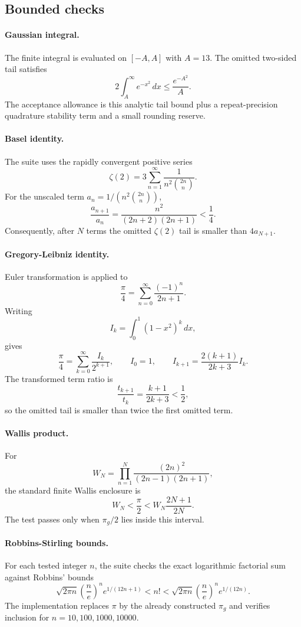 \documentclass[11pt]{article}
\newcommand{\pig}{\pi_g}
\begin{document}
\subsection{Bounded checks}

\paragraph{Gaussian integral.}
The finite integral is evaluated on $[-A,A]$ with $A=13$.  The omitted two-sided tail satisfies
\[
2\int_A^\infty e^{-x^2}\,dx
\le \frac{e^{-A^2}}{A}.
\]
The acceptance allowance is this analytic tail bound plus a repeat-precision quadrature stability term and a small rounding reserve.

\paragraph{Basel identity.}
The suite uses the rapidly convergent positive series
\[
\zeta(2)=3\sum_{n=1}^\infty
\frac{1}{n^2\binom{2n}{n}}.
\]
For the unscaled term $a_n=1/(n^2\binom{2n}{n})$,
\[
\frac{a_{n+1}}{a_n}
=\frac{n^2}{(2n+2)(2n+1)}<\frac14.
\]
Consequently, after $N$ terms the omitted $\zeta(2)$ tail is smaller than $4a_{N+1}$.

\paragraph{Gregory-Leibniz identity.}
Euler transformation is applied to
\[
\frac\pi4=\sum_{n=0}^\infty\frac{(-1)^n}{2n+1}.
\]
Writing
\[
I_k=\int_0^1(1-x^2)^k\,dx,
\]
gives
\[
\frac\pi4=\sum_{k=0}^\infty\frac{I_k}{2^{k+1}},
\qquad
I_0=1,
\qquad
I_{k+1}=\frac{2(k+1)}{2k+3}I_k.
\]
The transformed term ratio is
\[
\frac{t_{k+1}}{t_k}=\frac{k+1}{2k+3}<\frac12,
\]
so the omitted tail is smaller than twice the first omitted term.

\paragraph{Wallis product.}
For
\[
W_N=\prod_{n=1}^N\frac{(2n)^2}{(2n-1)(2n+1)},
\]
the standard finite Wallis enclosure is
\[
W_N<\frac\pi2<W_N\frac{2N+1}{2N}.
\]
The test passes only when $\pig/2$ lies inside this interval.

\paragraph{Robbins-Stirling bounds.}
For each tested integer $n$, the suite checks the exact logarithmic factorial sum against Robbins' bounds
\[
\sqrt{2\pi n}\left(\frac ne\right)^n e^{1/(12n+1)}
<n!
<
\sqrt{2\pi n}\left(\frac ne\right)^n e^{1/(12n)}.
\]
The implementation replaces $\pi$ by the already constructed $\pig$ and verifies inclusion for $n=10,100,1000,10000$.
\end{document}
